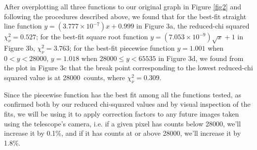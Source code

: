\documentclass{article}
\newcommand{\rcs}{\chi^2_\nu}
\begin{document}
After overplotting all three functions to our original graph in Figure \ref{fig2} and following the procedures described above, we found that for the best-fit straight line function $y=(3.777\times10^{-7})x+0.999$ in Figure 3a, the reduced-chi squared $\rcs=0.527$; for the best-fit square root function $y=(7.053\times10^{-9})\sqrt{x}+1$ in Figure 3b, $\rcs=3.763$; for the best-fit piecewise function $y=1.001$ when $0<y<28000$, $y=1.018$ when $28000\leq y<65535$ in Figure 3d, we found from the plot in Figure 3c that the break point corresponding to the lowest reduced-chi squared value is at 28000~counts, where $\rcs=0.309$.

Since the piecewise function has the best fit among all the functions tested, as confirmed both by our reduced chi-squared values and by visual inspection of the fits, we will be using it to apply correction factors to any future images taken using the telescope's camera, i.e. if a given pixel has counts below 28000, we'll increase it by 0.1\%, and if it has counts at or above 28000, we'll increase it by 1.8\%.
\end{document}
